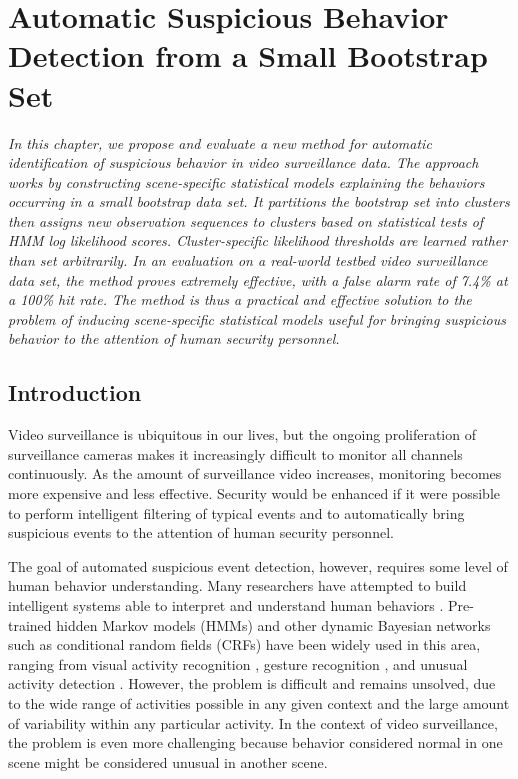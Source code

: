 \setlength{\footskip}{8mm}

\chapter{Automatic Suspicious Behavior Detection from 
a Small Bootstrap Set}
\label{ch:batch}

\textit{In this chapter, we propose and evaluate a new method for 
automatic identification of suspicious behavior in video surveillance
data. The approach works by constructing scene-specific statistical
models explaining the behaviors occurring in a small bootstrap data
set. It partitions the bootstrap set into clusters then assigns new
observation sequences to clusters based on statistical tests of HMM
log likelihood scores. Cluster-specific likelihood thresholds are
learned rather than set arbitrarily.  In an evaluation on a real-world
testbed video surveillance data set, the method proves extremely
effective, with a false alarm rate of 7.4\% at a 100\% hit rate. The
method is thus a practical and effective solution to the problem of
inducing scene-specific statistical models useful for bringing
suspicious behavior to the attention of human security personnel.}

\section{Introduction}
\label{sec:batch-intro}

Video surveillance is ubiquitous in our lives, but the ongoing
proliferation of surveillance cameras makes it increasingly difficult
to monitor all channels continuously. As the amount of surveillance
video increases, monitoring becomes more expensive and less
effective. Security would be enhanced if it were possible to perform
intelligent filtering of typical events and to automatically bring
suspicious events to the attention of human security personnel.

The goal of automated suspicious event detection, however, requires
some level of human behavior understanding. Many researchers have
attempted to build intelligent systems able to interpret and
understand human
behaviors .
Pre-trained hidden Markov models (HMMs) and other dynamic Bayesian
networks such as conditional random fields (CRFs) have been widely
used in this area, ranging from visual activity
recognition ,
gesture recognition , and
unusual activity
detection . However,
the problem is difficult and remains unsolved, due to the wide range
of activities possible in any given context and the large amount of
variability within any particular activity. In the context of video
surveillance, the problem is even more challenging because behavior
considered normal in one scene might be considered unusual in another
scene.

